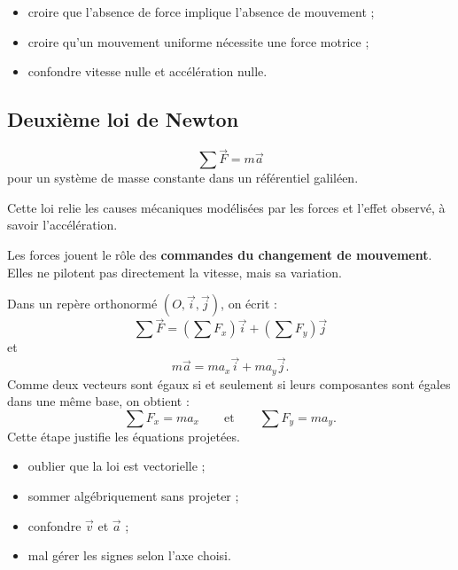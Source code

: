 \documentclass[11pt,a4paper]{article}
\begin{document}
\begin{erreurs}
\begin{itemize}
    \item croire que l'absence de force implique l'absence de mouvement ;
    \item croire qu'un mouvement uniforme nécessite une force motrice ;
    \item confondre vitesse nulle et accélération nulle.
\end{itemize}
\end{erreurs}

\subsection{Deuxième loi de Newton}

\begin{bilan}
\[
\sum \vec F = m\vec a
\]
pour un système de masse constante dans un référentiel galiléen.
\end{bilan}

\begin{sens}
Cette loi relie les causes mécaniques modélisées par les forces
et l'effet observé, à savoir l'accélération.
\end{sens}

\begin{imagem}
Les forces jouent le rôle des \textbf{commandes du changement de mouvement}.
Elles ne pilotent pas directement la vitesse, mais sa variation.
\end{imagem}

\begin{demo}
Dans un repère orthonormé \((O,\vec i,\vec j)\), on écrit :
\[
\sum \vec F = \left(\sum F_x\right)\vec i + \left(\sum F_y\right)\vec j
\]
et
\[
m\vec a = ma_x\vec i + ma_y\vec j.
\]
Comme deux vecteurs sont égaux si et seulement si leurs composantes sont égales dans une même base,
on obtient :
\[
\sum F_x = ma_x
\qquad \text{et} \qquad
\sum F_y = ma_y.
\]
Cette étape justifie les équations projetées.
\end{demo}

\begin{erreurs}
\begin{itemize}
    \item oublier que la loi est vectorielle ;
    \item sommer algébriquement sans projeter ;
    \item confondre \(\vec v\) et \(\vec a\) ;
    \item mal gérer les signes selon l'axe choisi.
\end{itemize}
\end{erreurs}
\end{document}
